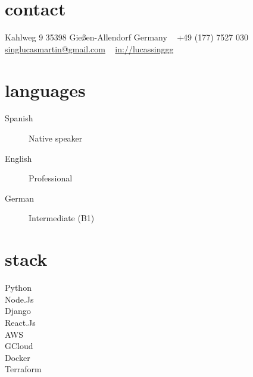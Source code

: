 \documentclass[a4paper,nocolors]{cv-friggeri-x}
\begin{document}


\begin{aside} %
\section{contact}
\pin \hfill Kahlweg 9
35398 Gießen-Allendorf
Germany
~
{\Large\textcolor{gray}{\Mobilefone}} \hfill +49 (177) 7527 030
\hfill \href{mailto:singlucasmartin@gmail.com}{\footnotesize singlucasmartin@gmail.com}
~
\llogo \hfill \href{https://www.linkedin.com/in/lucassinggg}{in://lucassinggg}
~
\section{languages}
\begin{description}
  \item[Spanish] \hfill Native speaker
  \item[English] \hfill Professional
  \item[German] \hfill Intermediate (B1)
\end{description}
\section{stack}
\begin{description} 
  \item[Python] \hfill \filleddot \filleddot \filleddot \filleddot \emptydot
  \item[Node.Js] \hfill \filleddot \filleddot \filleddot \emptydot \emptydot
  \item[Django] \hfill \filleddot \filleddot \filleddot \filleddot \filleddot 
  \item[React.Js] \hfill \filleddot \filleddot \filleddot \emptydot \emptydot
  \item[AWS] \hfill \filleddot \filleddot \filleddot \emptydot \emptydot
  \item[GCloud] \hfill \filleddot \filleddot \filleddot \emptydot \emptydot
  \item[Docker] \hfill \filleddot \filleddot \filleddot \filleddot \emptydot
  \item[Terraform] \hfill \filleddot \emptydot \emptydot \emptydot \emptydot
\end{description}
\end{aside}
\end{document}
